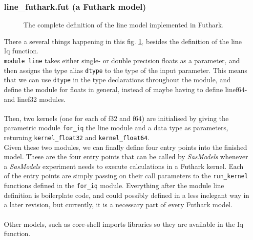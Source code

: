 \documentclass[11pt]{article}
\newcommand{\sasmodels}{\textit{SasModels}}
\begin{document}
\subsubsection{line\_futhark.fut (a Futhark model)}
\label{sec:line-fut}

\begin{figure}
  
  \caption{The complete definition of the line model implemented in Futhark.}
  \label{fig:linemodel-futhark-full}
\end{figure}

There a several things happening in this fig. \ref{fig:linemodel-futhark-full}, 
besides the definition of the line Iq function.
\\
\texttt{module line} takes either single- or double precision floats as a
parameter, and then assigns the type alias \texttt{dtype} to the type of the
input parameter. This means that we can use \texttt{dtype} in the type
declarations throughout the module, and define the module for floats in general,
instead of maybe having to define linef64- and linef32 modules.
\\\\
Then, two kernels (one for each of f32 and f64) are initialised by giving
the parametric module \texttt{for\_iq} the line module and a data type 
as parameters, returning \texttt{kernel\_float32} and \texttt{kernel\_float64}.
\\
Given these two modules, we can finally define four entry points into the
finished model. These are the four entry points that can be called by 
\sasmodels{} whenever a \sasmodels{} experiment needs to execute calculations 
in a Futhark kernel.
Each of the entry points are simply passing on their call parameters to the 
\texttt{run\_kernel} functions defined in the \texttt{for\_iq} module.
Everything after the module line definition is boilerplate code, and could
possibly defined in a less inelegant way in a later revision, but currently, it 
is a necessary part of every Futhark model.
\\\\
Other models, such as core-shell imports libraries so they are 
available in the Iq function.
\end{document}
